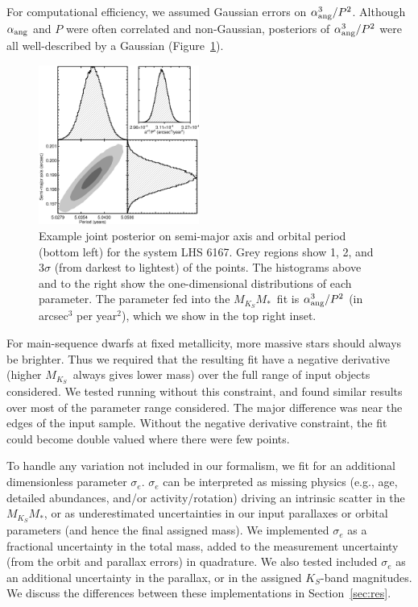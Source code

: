 \documentclass[twocolumn]{aastex62}
\newcommand{\mks}{$M_{K_S}$}
\newcommand{\mmk}{$M_{K_S}$\textendash$M_*$}
\begin{document}
For computational efficiency, we assumed Gaussian errors on $\alpha_{\rm{ang}}^3/P^2$. Although $\alpha_{\rm{ang}}$ and $P$ were often correlated and non-Gaussian, posteriors of $\alpha_{\rm{ang}}^3/P^2$ were all well-described by a Gaussian (Figure~\ref{fig:correlated}). 

\begin{figure}[htb]
\begin{center}
\includegraphics[width=0.47\textwidth]{LHS6167_corner.eps}
\caption{Example joint posterior on semi-major axis and orbital period (bottom left) for the system LHS 6167. Grey regions show 1, 2, and 3$\sigma$ (from darkest to lightest) of the points. The histograms above and to the right show the one-dimensional distributions of each parameter. The parameter fed into the \mmk\ fit is $\alpha_{\rm{ang}}^3/P^2$ (in arcsec$^3$ per year$^2$), which we show in the top right inset. }
\label{fig:correlated}
\end{center}
\end{figure}

For main-sequence dwarfs at fixed metallicity, more massive stars should always be brighter. Thus we required that the resulting fit have a negative derivative (higher \mks\ always gives lower mass) over the full range of input objects considered. We tested running without this constraint, and found similar results over most of the parameter range considered. The major difference was near the edges of the input sample. Without the negative derivative constraint, the fit could become double valued where there were few points.

To handle any variation not included in our formalism, we fit for an additional dimensionless parameter $\sigma_e$. $\sigma_e$ can be interpreted as missing physics (e.g., age, detailed abundances, and/or activity/rotation) driving an intrinsic scatter in the \mmk, or as underestimated uncertainties in our input parallaxes or orbital parameters (and hence the final assigned mass). We implemented $\sigma_e$ as a fractional uncertainty in the total mass, added to the measurement uncertainty (from the orbit and parallax errors) in quadrature. We also tested included $\sigma_e$ as an additional uncertainty in the parallax, or in the assigned $K_S$-band magnitudes. We discuss the differences between these implementations in Section~\ref{sec:res}.
\end{document}
